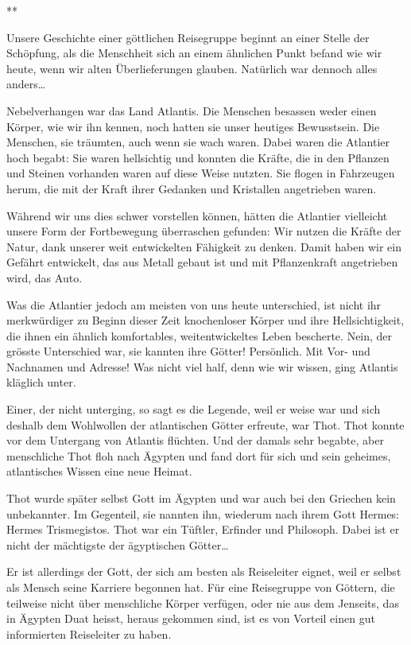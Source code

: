 \documentclass[11pt,titlepage,a5paper]{book}
\newcommand{\sterne}{\par{\centering ***\par}}
\begin{document}
\sterne

Unsere Geschichte einer göttlichen Reisegruppe beginnt an einer Stelle der Schöpfung, als die Menschheit sich an einem ähnlichen Punkt befand wie wir heute, wenn wir alten Überlieferungen glauben. Natürlich war dennoch alles anders\dots

Nebelverhangen war das Land Atlantis. Die Menschen besassen weder einen Körper, wie wir ihn kennen, noch hatten sie unser heutiges Bewusstsein. Die Menschen, sie träumten, auch wenn sie wach waren. Dabei waren die Atlantier hoch begabt: Sie waren hellsichtig und konnten die Kräfte, die in den Pflanzen und Steinen vorhanden waren auf diese Weise nutzten.  Sie flogen in Fahrzeugen herum, die mit der Kraft ihrer Gedanken und Kristallen angetrieben waren.

Während wir uns dies schwer vorstellen können, hätten die Atlantier vielleicht unsere Form der Fortbewegung überraschen gefunden: Wir nutzen die Kräfte der Natur, dank unserer weit entwickelten Fähigkeit zu denken. Damit haben wir ein Gefährt entwickelt, das aus Metall gebaut ist und mit Pflanzenkraft angetrieben wird, das Auto.

Was die Atlantier jedoch am meisten von uns heute unterschied, ist nicht ihr merkwürdiger zu Beginn dieser Zeit knochenloser Körper und ihre Hellsichtigkeit, die ihnen ein ähnlich komfortables, weitentwickeltes Leben bescherte. Nein, der grösste Unterschied war, sie kannten ihre Götter! Persönlich. Mit Vor- und Nachnamen und Adresse! Was nicht viel half, denn wie wir wissen, ging Atlantis kläglich unter.

Einer, der nicht unterging, so sagt es die Legende, weil er weise war und sich deshalb dem Wohlwollen der atlantischen Götter erfreute, war Thot. Thot konnte vor dem Untergang von Atlantis flüchten. Und der damals sehr begabte, aber menschliche Thot floh nach Ägypten und fand dort für sich und sein geheimes, atlantisches Wissen eine neue Heimat.

Thot wurde später selbst Gott im Ägypten und war auch bei den Griechen kein unbekannter. Im Gegenteil, sie nannten ihn, wiederum nach ihrem Gott Hermes: Hermes Trismegistos. Thot war ein Tüftler, Erfinder und Philosoph. Dabei ist er nicht der mächtigste der ägyptischen Götter\dots


Er ist allerdings der Gott, der sich am besten als Reiseleiter eignet, weil er selbst als Mensch seine Karriere begonnen hat. Für eine Reisegruppe von Göttern, die teilweise nicht über menschliche Körper verfügen, oder nie aus dem Jenseits, das in Ägypten Duat heisst, heraus gekommen sind, ist es von Vorteil einen gut informierten Reiseleiter zu haben.
\end{document}
